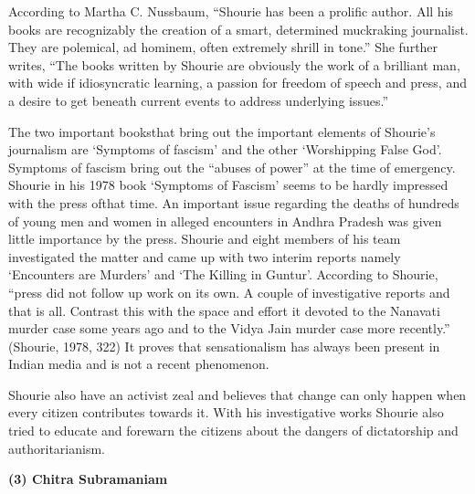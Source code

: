 \begin{multicols}{2}
\noi
According to Martha C. Nussbaum, “Shourie has been a prolific author. All his books are
recognizably the creation of a smart, determined muckraking journalist. They are polemical,
ad hominem, often extremely shrill in tone.” She further writes, “The books written by Shourie
are obviously the work of a brilliant man, with wide if idiosyncratic learning, a passion for freedom of speech and press, and a desire to get beneath current events to address underlying issues.”

\noi
The two important booksthat bring out the important elements of Shourie’s journalism
are ‘Symptoms of fascism’ and the other ‘Worshipping False God’. Symptoms of fascism bring
out the “abuses of power” at the time of emergency. Shourie in his 1978 book ‘Symptoms of
Fascism’ seems to be hardly impressed with the press ofthat time. An important issue regarding
the deaths of hundreds of young men and women in alleged encounters in Andhra Pradesh was
given little importance by the press. Shourie and eight members of his team investigated the
matter and came up with two interim reports namely ‘Encounters are Murders’ and ‘The Killing
in Guntur’. According to Shourie, “press did not follow up work on its own. A couple of
investigative reports and that is all. Contrast this with the space and effort it devoted to the
Nanavati murder case some years ago and to the Vidya Jain murder case more recently.”
(Shourie, 1978, 322) It proves that sensationalism has always been present in Indian media and
is not a recent phenomenon.

\noi
Shourie also have an activist zeal and believes that change can only happen when every citizen
contributes towards it. With his investigative works Shourie also tried to educate and forewarn
the citizens about the dangers of dictatorship and authoritarianism.

\vspace{-.15cm}

\noi
{\large \bfseries (3) Chitra Subramaniam}

\vspace{-.15cm}


\end{multicols}
